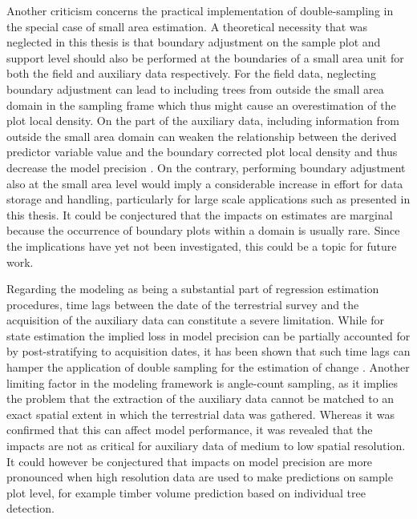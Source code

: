 Another criticism concerns the practical implementation of double-sampling in the special case of small area estimation. A theoretical necessity that was neglected in this thesis is that boundary adjustment on the sample plot and support level should also be performed at the boundaries of a small area unit for both the field and auxiliary data respectively. For the field data, neglecting boundary adjustment can lead to including trees from outside the small area domain in the sampling frame which thus might cause an overestimation of the plot local density. On the part of the auxiliary data, including information from outside the small area domain can weaken the relationship between the derived predictor variable value and the boundary corrected plot local density and thus decrease the model precision \citep{mandallaz2013b}. On the contrary, performing boundary adjustment also at the small area level would imply a considerable increase in effort for data storage and handling, particularly for large scale applications such as presented in this thesis. It could be conjectured that the impacts on estimates are marginal because the occurrence of boundary plots within a domain is usually rare. Since the implications have yet not been investigated, this could be a topic for future work.\par

Regarding the modeling as being a substantial part of regression estimation procedures, time lags between the date of the terrestrial survey and the acquisition of the auxiliary data can constitute a severe limitation. While for state estimation the implied loss in model precision can be partially accounted for by post-stratifying to acquisition dates, it has been shown that such time lags can hamper the application of double sampling for the estimation of change \citep{massey2015_thesis}. Another limiting factor in the modeling framework is angle-count sampling, as it implies the problem that the extraction of the auxiliary data cannot be matched to an exact spatial extent in which the terrestrial data was gathered. Whereas it was confirmed that this can affect model performance, it was revealed that the impacts are not as critical for auxiliary data of medium to low spatial resolution. It could however be conjectured that impacts on model precision are more pronounced when high resolution data are used to make predictions on sample plot level, for example timber volume prediction based on individual tree detection.\par

